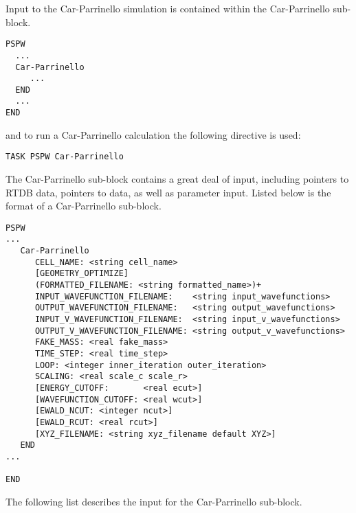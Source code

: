 Input to the Car-Parrinello 
simulation is contained within the Car-Parrinello sub-block.
\begin{verbatim}
PSPW
  ...
  Car-Parrinello
     ...
  END
  ...
END
\end{verbatim}
and to run a Car-Parrinello calculation the following directive is used:
\begin{verbatim}
TASK PSPW Car-Parrinello 
\end{verbatim}
The Car-Parrinello sub-block contains a great deal
of input, including pointers to RTDB data, pointers to data, as well as
parameter input.  Listed below is the format of a Car-Parrinello sub-block.
\begin{verbatim}
PSPW
...
   Car-Parrinello
      CELL_NAME: <string cell_name>
      [GEOMETRY_OPTIMIZE]
      (FORMATTED_FILENAME: <string formatted_name>)+
      INPUT_WAVEFUNCTION_FILENAME:    <string input_wavefunctions>
      OUTPUT_WAVEFUNCTION_FILENAME:   <string output_wavefunctions>
      INPUT_V_WAVEFUNCTION_FILENAME:  <string input_v_wavefunctions>
      OUTPUT_V_WAVEFUNCTION_FILENAME: <string output_v_wavefunctions>
      FAKE_MASS: <real fake_mass>
      TIME_STEP: <real time_step>
      LOOP: <integer inner_iteration outer_iteration>
      SCALING: <real scale_c scale_r>
      [ENERGY_CUTOFF:       <real ecut>]
      [WAVEFUNCTION_CUTOFF: <real wcut>]
      [EWALD_NCUT: <integer ncut>]
      [EWALD_RCUT: <real rcut>]
      [XYZ_FILENAME: <string xyz_filename default XYZ>]
   END
...

END
\end{verbatim}
The following list describes the input for the Car-Parrinello
sub-block.
